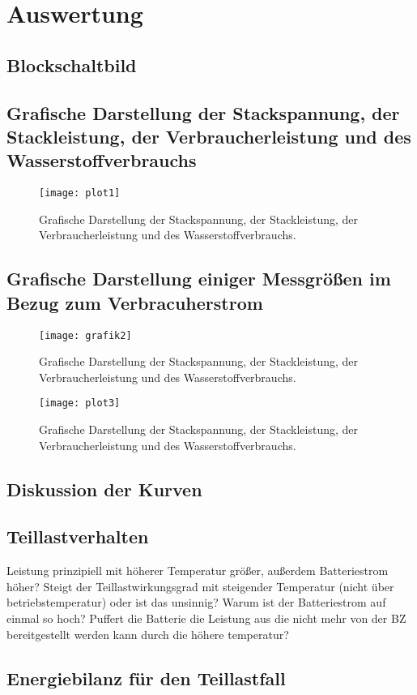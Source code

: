 \section{Auswertung}
\label{sec:Auswertung}


\subsection{Blockschaltbild}
\subsection{Grafische Darstellung der Stackspannung, der
Stackleistung, der Verbraucherleistung und des Wasserstoffverbrauchs}
\begin{figure}[H]
    \centering
    \texttt{[image: plot1]}
    \caption{Grafische Darstellung der Stackspannung, der
    Stackleistung, der Verbraucherleistung und des Wasserstoffverbrauchs.}
    \label{fig:plot1_26062023}
  \end{figure}
\subsection{Grafische Darstellung einiger Messgrößen im Bezug zum Verbracuherstrom}
\begin{figure}[H]
    \centering
    \texttt{[image: grafik2]}
    \caption{Grafische Darstellung der Stackspannung, der
    Stackleistung, der Verbraucherleistung und des Wasserstoffverbrauchs.}
    \label{fig:plot2_26062023}
  \end{figure}
  \begin{figure}[H]
    \centering
    \texttt{[image: plot3]}
    \caption{Grafische Darstellung der Stackspannung, der
    Stackleistung, der Verbraucherleistung und des Wasserstoffverbrauchs.}
    \label{fig:plot3_26062023}
  \end{figure}
\subsection{Diskussion der Kurven}
\subsection{}
\subsection{Teillastverhalten}

Leistung prinzipiell mit höherer Temperatur größer, außerdem Batteriestrom höher? 
Steigt der Teillastwirkungsgrad mit steigender Temperatur (nicht über betriebstemperatur) oder ist das unsinnig?
Warum ist der Batteriestrom auf einmal so hoch? Puffert die Batterie die Leistung aus die nicht mehr von der BZ bereitgestellt werden kann durch die höhere temperatur?



\subsection{Energiebilanz für den Teillastfall}